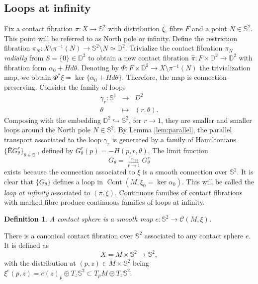 \documentclass[10pt]{amsart}
\newtheorem{definition}[proposition]{Definition}
\begin{document}
\subsection{Loops at infinity}
\noindent Fix a contact fibration $\pi:X \longrightarrow {\mathbb{S}}^2$ with distribution $\xi$, fibre $F$ and a point $N\in  {\mathbb{S}}^2$. This point will be referred to as North pole or infinity. Define the restriction fibration $\pi_N: X \setminus \pi^{-1}(N) \longrightarrow {\mathbb{S}}^2 \setminus N \simeq{\mathbb{D}}^2$. Trivialize the contact fibration $\pi_N$ {\it radially} from $S= \{ 0 \} \in{\mathbb{D}}^2$ to obtain a new contact fibration $\hat{\pi}: F \times{\mathbb{D}}^2\longrightarrow{\mathbb{D}}^2$ with fibration form $\alpha_0+ Hd\theta$. Denoting by $\Phi: F\times{\mathbb{D}}^2 \longrightarrow X\setminus \pi^{-1}(N)$ the trivialization map, we obtain $\Phi^* \xi = \ker\{\alpha_0+ Hd\theta\}$. Therefore, the map is connection--preserving. Consider the family of loops
\begin{eqnarray*}
\gamma_r: {\mathbb{S}}^1 & \longrightarrow & D^2 \\
\theta & \longmapsto & (r, \theta).
\end{eqnarray*}
Composing with the embedding ${\mathbb{D}}^2 \hookrightarrow {\mathbb{S}}^2$, for $r \longrightarrow1$, they are smaller and smaller loops around the North pole $N \in {\mathbb{S}}^2$. By Lemma \ref{lem:parallel}, the parallel transport associated to the loop $\gamma_r$ is generated by a family of Hamiltonians $\{ÊG_{\theta}^r \}_{\theta \in {\mathbb{S}}^1}$, defined by $G_{\theta}^r(p)= -H(p,r, \theta)$. The limit function
$$G_{\theta}= \lim_{r\longrightarrow 1} G_{\theta}^r$$
exists because the connection associated to $\xi$ is a smooth connection over ${\mathbb{S}}^2$. It is clear that $\{ G_{\theta} \}$ defines a loop in ${\operatorname{Cont}}(M, \xi_0 = \ker \alpha_0)$. This will be called the {\it loop at infinity} associated to $(\pi, \xi)$. Continuous families of contact fibrations with marked fibre produce continuous families of loops at infinity.

\begin{definition} A contact sphere is a smooth map $e: {\mathbb{S}}^2 \longrightarrow{\mathcal{C}}(M, \xi)$.
\end{definition}
\noindent There is a canonical contact fibration over ${\mathbb{S}}^2$ associated to any contact sphere $e$. It is defined as
$$X= M\times {\mathbb{S}}^2\longrightarrow{\mathbb{S}}^2,$$
with the distribution at $(p,z)\in M \times {\mathbb{S}}^2$ being $\xi^e(p,z)= e(z)_p \oplus T_z {\mathbb{S}}^2 \subset T_pM \oplus T_z {\mathbb{S}}^2$. \\
\end{document}
